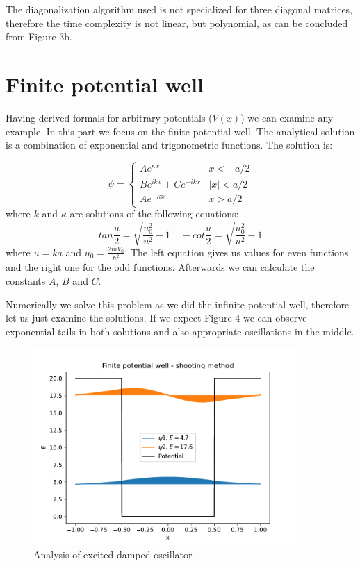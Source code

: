 \documentclass[12pt, a4paper]{article}
\begin{document}
The diagonalization algorithm used is not specialized for three diagonal matrices, therefore the time complexity is not linear, but polynomial, as can be concluded from Figure 3b.

\section{Finite potential well} 
 
Having derived formals for arbitrary potentials ($V(x)$) we can examine any example. In this part we focus on the finite potential well. The analytical solution is a combination of exponential and trigonometric functions. The solution is:

\begin{equation*}
    \psi = \begin{cases}
    Ae^{\kappa x}  & x < -a/2 \\
    Be^{ikx} + Ce^{-ikx} & |x| < a/2\\
    Ae^{-\kappa x} & x > a/2
    \end{cases}
\end{equation*}
where $k$ and $\kappa$ are solutions of the following equations:
\begin{equation*}
    tan\frac{u}{2} = \sqrt{\frac{u_0^2}{u^2}-1}\quad
    -cot\frac{u}{2} = \sqrt{\frac{u_0^2}{u^2}-1}
\end{equation*}
where $u = ka$ and $u_0 = \frac{2mV_0}{\hbar^2}$. The left equation gives us values for even functions and the right one for the odd functions. Afterwards we can calculate the constants $A$, $B$ and $C$.

Numerically we solve this problem as we did the infinite potential well, therefore let us just examine the solutions. If we expect Figure 4 we can observe exponential tails in both solutions and also appropriate oscillations in the middle.
 
\begin{figure}[hbtp]
  \begin{center}
  \includegraphics[width=10cm]{shoot_finite.pdf}
  \end{center}
  \vspace*{-7mm}
  \caption{Analysis of excited damped oscillator}
\end{figure}
\end{document}
